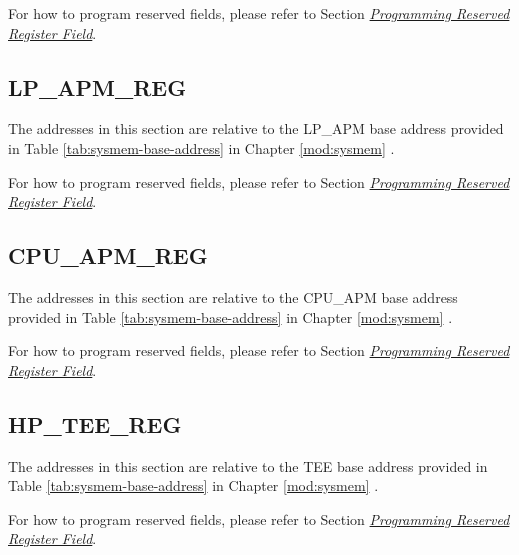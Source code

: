 \documentclass[main\_\_EN.tex]{subfiles}
\begin{document}
For how to program reserved fields, please refer to Section \hyperref[programming-reserved-field]{\textit{Programming Reserved Register Field}}.



\subsection{LP\_APM\_REG}

The addresses in this section are relative to the LP\_APM base address provided in Table \ref{tab:sysmem-base-address} in Chapter \ref{mod:sysmem} \textit{}.

For how to program reserved fields, please refer to Section \hyperref[programming-reserved-field]{\textit{Programming Reserved Register Field}}.



\subsection{CPU\_APM\_REG}

The addresses in this section are relative to the CPU\_APM base address provided in Table \ref{tab:sysmem-base-address} in Chapter \ref{mod:sysmem} \textit{}.

For how to program reserved fields, please refer to Section \hyperref[programming-reserved-field]{\textit{Programming Reserved Register Field}}.



\subsection{HP\_TEE\_REG}

The addresses in this section are relative to the TEE base address provided in Table \ref{tab:sysmem-base-address} in Chapter \ref{mod:sysmem} \textit{}.

For how to program reserved fields, please refer to Section \hyperref[programming-reserved-field]{\textit{Programming Reserved Register Field}}.


\end{document}
